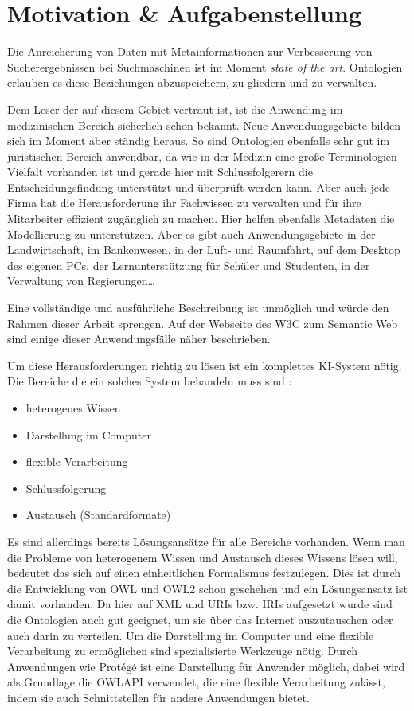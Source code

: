 \chapter{Motivation \& Aufgabenstellung}
\label{kapitel-motivation}

Die Anreicherung von Daten mit Metainformationen zur Verbesserung von Sucherergebnissen bei Suchmaschinen ist im Moment \emph{state of the art}. Ontologien erlauben es diese Beziehungen abzuspeichern, zu gliedern und zu verwalten.

Dem Leser der auf diesem Gebiet vertraut ist, ist die Anwendung im medizinischen Bereich sicherlich schon bekannt. Neue Anwendungsgebiete bilden sich im Moment aber ständig heraus. So sind Ontologien ebenfalls sehr gut im juristischen Bereich anwendbar, da wie in der Medizin eine große Terminologien-Vielfalt vorhanden ist und gerade hier mit Schlussfolgerern die Entscheidungsfindung unterstützt und überprüft werden kann.
Aber auch jede Firma hat die Herausforderung ihr Fachwissen zu verwalten und für ihre Mitarbeiter effizient zugänglich zu machen. Hier helfen ebenfalls Metadaten die Modellierung zu unterstützen.
Aber es gibt auch Anwendungsgebiete in der Landwirtschaft, im Bankenwesen, in der Luft- und Raumfahrt, auf dem Desktop des eigenen PCs, der Lernunterstützung für Schüler und Studenten, in der Verwaltung von Regierungen\ldots

Eine vollständige und ausführliche Beschreibung ist unmöglich und würde den Rahmen dieser Arbeit sprengen. Auf der Webseite des W3C zum Semantic Web \cite{W3CUseCases} sind einige dieser Anwendungsfälle näher beschrieben.

Um diese Herausforderungen richtig zu lösen ist ein komplettes KI-System nötig. Die Bereiche die ein solches System behandeln muss sind \cite{vonHenke2009}:

\begin{itemize}
  \item heterogenes Wissen
  \item Darstellung im Computer
  \item flexible Verarbeitung
  \item Schlussfolgerung
  \item Austausch (Standardformate)
\end{itemize}

Es sind allerdings bereits Lösungsansätze für alle Bereiche vorhanden. Wenn man die Probleme von heterogenem Wissen und Austausch dieses Wissens lösen will, bedeutet das sich auf einen einheitlichen Formalismus festzulegen. Dies ist durch die Entwicklung von OWL und OWL2 schon geschehen und ein Lösungsansatz ist damit vorhanden. Da hier auf XML und URIs bzw. IRIs aufgesetzt wurde sind die Ontologien auch gut geeignet, um sie über das Internet auszutauschen oder auch darin zu verteilen. Um die Darstellung im Computer und eine flexible Verarbeitung zu ermöglichen sind spezialisierte Werkzeuge nötig. Durch Anwendungen wie Protégé ist eine Darstellung für Anwender möglich, dabei wird als Grundlage die OWLAPI verwendet, die eine flexible Verarbeitung zulässt, indem sie auch Schnittstellen für andere Anwendungen bietet.

